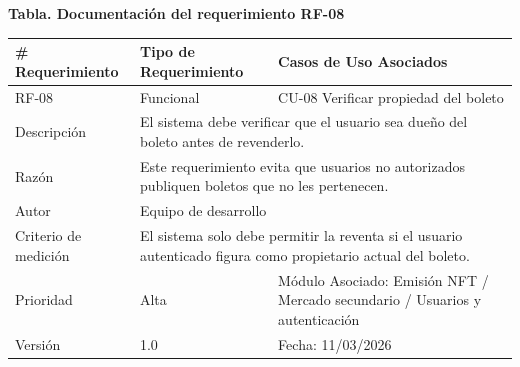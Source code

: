 \documentclass[12pt,letterpaper]{article}
\begin{document}
\noindent
\begin{minipage}{\textwidth}
\centering
\scriptsize
\renewcommand{\arraystretch}{0.9}
\setlength{\tabcolsep}{3pt}
\setlength{\arrayrulewidth}{0.5pt}

\textbf{Tabla. Documentación del requerimiento RF-08}

\vspace{2pt}

\begin{tabularx}{\textwidth}{|p{2.6cm}|X|p{3.4cm}|}
\hline
\# Requerimiento & Tipo de Requerimiento & Casos de Uso Asociados \\ \hline
RF-08 & Funcional & CU-08 Verificar propiedad del boleto \\ \hline
Descripción & \multicolumn{2}{X|}{El sistema debe verificar que el usuario sea dueño del boleto antes de revenderlo.} \\ \hline
Razón & \multicolumn{2}{X|}{Este requerimiento evita que usuarios no autorizados publiquen boletos que no les pertenecen.} \\ \hline
Autor & \multicolumn{2}{X|}{Equipo de desarrollo} \\ \hline
Criterio de medición & \multicolumn{2}{X|}{El sistema solo debe permitir la reventa si el usuario autenticado figura como propietario actual del boleto.} \\ \hline
Prioridad & Alta & Módulo Asociado: Emisión NFT / Mercado secundario / Usuarios y autenticación \\ \hline
Versión & 1.0 & Fecha: 11/03/2026 \\ \hline
\end{tabularx}
\end{minipage}

\vspace{0.2cm}
\end{document}

